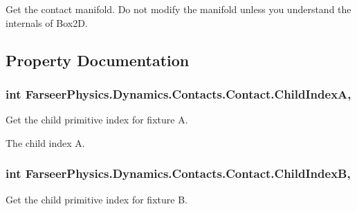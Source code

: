 Get the contact manifold. Do not modify the manifold unless you understand the internals of Box2\+D. 



\subsection{Property Documentation}
\hypertarget{class_farseer_physics_1_1_dynamics_1_1_contacts_1_1_contact_a7d610dcd4c90bc723024de3d7f50db46}{
\subsubsection[{Child\+Index\+A}]{\setlength{\rightskip}{0pt plus 5cm}int Farseer\+Physics.\+Dynamics.\+Contacts.\+Contact.\+Child\+Index\+A\hspace{0.3cm}{\ttfamily [get]}, {\ttfamily [set]}}}\label{class_farseer_physics_1_1_dynamics_1_1_contacts_1_1_contact_a7d610dcd4c90bc723024de3d7f50db46}


Get the child primitive index for fixture A. 

The child index A.\hypertarget{class_farseer_physics_1_1_dynamics_1_1_contacts_1_1_contact_ac3620ad558a4219e200de3c519c80652}{
\subsubsection[{Child\+Index\+B}]{\setlength{\rightskip}{0pt plus 5cm}int Farseer\+Physics.\+Dynamics.\+Contacts.\+Contact.\+Child\+Index\+B\hspace{0.3cm}{\ttfamily [get]}, {\ttfamily [set]}}}\label{class_farseer_physics_1_1_dynamics_1_1_contacts_1_1_contact_ac3620ad558a4219e200de3c519c80652}


Get the child primitive index for fixture B. 

